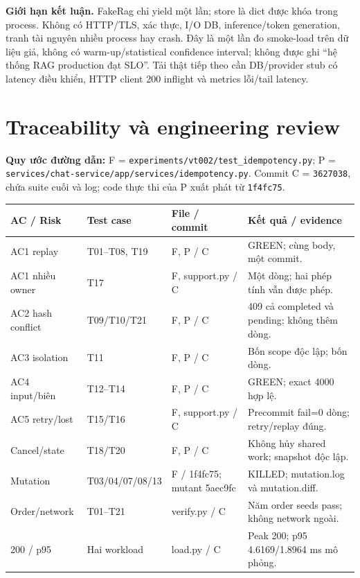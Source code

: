\documentclass[11pt,a4paper]{article}
\DeclareRobustCommand{\code}[1]{\nolinkurl{#1}}
\begin{document}
\textbf{Giới hạn kết luận.} FakeRag chỉ yield một lần; store là dict được khóa trong process. Không có HTTP/TLS, xác thực, I/O DB, inference/token generation, tranh tài nguyên nhiều process hay crash. Đây là một lần đo smoke-load trên dữ liệu giả, không có warm-up/statistical confidence interval; không được ghi ``hệ thống RAG production đạt SLO''. Tải thật tiếp theo cần DB/provider stub có latency điều khiển, HTTP client 200 inflight và metrics lỗi/tail latency.

\newpage
\section{Traceability và engineering review}
\textbf{Quy ước đường dẫn:} F = \code{experiments/vt002/test_idempotency.py}; P = \code{services/chat-service/app/services/idempotency.py}. Commit C = \code{3627038}, chứa suite cuối và log; code thực thi của P xuất phát từ \code{1f4fc75}.

\begin{tabular}{@{}L{23mm}L{32mm}L{31mm}L{\dimexpr\textwidth-86mm-6\tabcolsep\relax}@{}}
\toprule
\textbf{AC / Risk} & \textbf{Test case} & \textbf{File / commit} & \textbf{Kết quả / evidence}\\\midrule
AC1 replay & T01--T08, T19 & F, P / C & GREEN; cùng body, một commit.\\[3pt]
AC1 nhiều owner & T17 & F, support.py / C & Một dòng; hai phép tính vẫn được phép.\\[3pt]
AC2 hash conflict & T09/T10/T21 & F, P / C & 409 cả completed và pending; không thêm dòng.\\[3pt]
AC3 isolation & T11 & F, P / C & Bốn scope độc lập; bốn dòng.\\[3pt]
AC4 input/biên & T12--T14 & F, P / C & GREEN; exact 4000 hợp lệ.\\[3pt]
AC5 retry/lost & T15/T16 & F, support.py / C & Precommit fail=0 dòng; retry/replay đúng.\\[3pt]
Cancel/state & T18/T20 & F, P / C & Không hủy shared work; snapshot độc lập.\\[3pt]
Mutation & T03/04/07/08/13 & F / 1f4fc75; mutant 5aec9fc & KILLED; mutation.log và mutation.diff.\\[3pt]
Order/network & T01--T21 & verify.py / C & Năm order seeds pass; không network ngoài.\\[3pt]
200 / p95 & Hai workload & load.py / C & Peak 200; p95 4.6169/1.8964 ms mô phỏng.\\
\bottomrule
\end{tabular}
\end{document}
